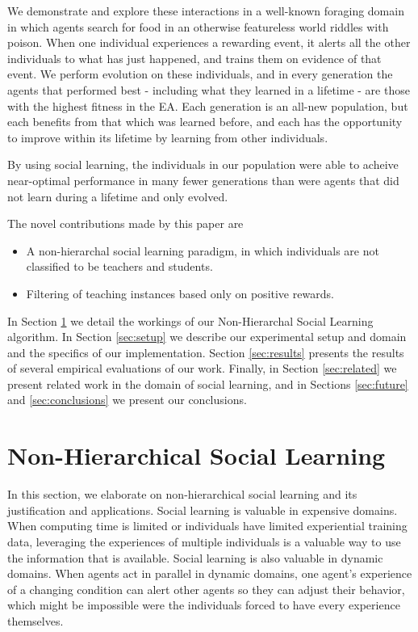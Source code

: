 \documentclass{acm_proc_article-sp}
\begin{document}
We demonstrate and explore these interactions in a well-known foraging domain in which agents search for food in an otherwise featureless world riddles with poison.  When one individual experiences a rewarding event, it alerts all the other individuals to what has just happened, and trains them on evidence of that event.
We perform evolution on these individuals, and in every generation the agents that performed best - including what they learned in a lifetime - are those with the highest fitness in the EA.  
Each generation is an all-new population, but each benefits from that which was learned before, and each has the opportunity to improve within its lifetime by learning from other individuals.
    
By using social learning, the individuals in our population were able to acheive near-optimal performance in many fewer generations than were agents that did not learn during a lifetime and only evolved.

The novel contributions made by this paper are 
\begin{itemize}
\item A non-hierarchal social learning paradigm, in which individuals are not classified to be teachers and students.
\item Filtering of teaching instances based only on positive rewards. 
\end{itemize}
 
 In Section \ref{sec:nhsl} we detail the workings of our Non-Hierarchal Social Learning algorithm.
In Section \ref{sec:setup} we describe our experimental setup and domain and the specifics of our implementation.
Section \ref{sec:results} presents the results of several empirical evaluations of our work.
Finally, in Section \ref{sec:related} we present related work in the domain of social learning, and in Sections \ref{sec:future} and \ref{sec:conclusions} we present our conclusions.

\section{Non-Hierarchical Social Learning}
\label{sec:nhsl}
In this section, we elaborate on non-hierarchical social learning and its justification and applications.
Social learning is valuable in expensive domains.  When computing time is limited or individuals have limited experiential training data, leveraging the experiences of multiple individuals is a valuable way to use the information that is available.
Social learning is also valuable in dynamic domains. 
When agents act in parallel in dynamic domains, one agent's experience of a changing condition can alert other agents so they can adjust their behavior, which might be impossible were the individuals forced to have every experience themselves.
\end{document}
